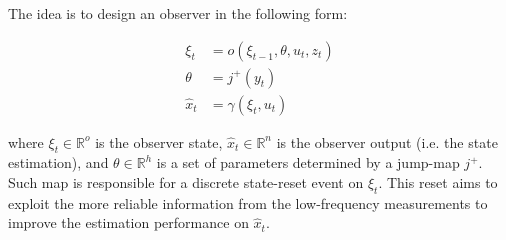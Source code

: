 \medskip
The idea is to design an observer in the following form: 

\begin{subequations}
    \label{eqn:observer_hyb}
    \begin{align}
        \xi_t &= o(\xi_{t-1},\theta,u_t,z_t) \\
        \theta &= j^{+}(y_t) \\
        \hat{x}_t &= \gamma(\xi_t,u_t) 
    \end{align}
\end{subequations}

where $\xi_t\in\mathbb{R}^o$ is the observer state, $\hat{x}_t\in\mathbb{R}^n$ is the observer output (i.e. the state estimation), and $\theta\in\mathbb{R}^h$ is a set of parameters determined by a jump-map $j^{+}$. Such map is responsible for a discrete state-reset event on $\xi_t$. This reset aims to exploit the more reliable information from the low-frequency measurements to improve the estimation performance on $\hat{x}_t$.